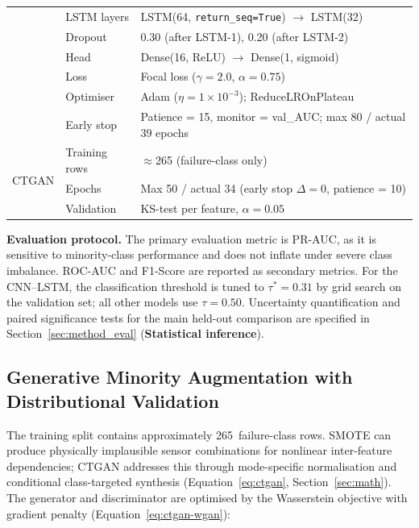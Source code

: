 \documentclass[sensors,article,submit,pdftex,moreauthors]{Definitions/mdpi}
\begin{document}
\begin{table}[H]
\begin{tabularx}{\textwidth}{llX}
  & LSTM layers     & LSTM(64, \texttt{return\_seq=True}) $\to$ LSTM(32) \\
  & Dropout         & 0.30 (after LSTM-1), 0.20 (after LSTM-2) \\
  & Head            & Dense(16, ReLU) $\to$ Dense(1, sigmoid) \\
  & Loss            & Focal loss ($\gamma = 2.0$, $\alpha = 0.75$) \\
  & Optimiser       & Adam ($\eta = 1\times10^{-3}$); ReduceLROnPlateau \\
  & Early stop      & Patience = 15, monitor = val\_AUC; max 80 / actual 39 epochs \\
\midrule
\multirow{3}{*}{CTGAN}
  & Training rows   & $\approx$265 (failure-class only) \\
  & Epochs          & Max 50 / actual 34 (early stop $\Delta = 0$, patience = 10) \\
  & Validation      & KS-test per feature, $\alpha = 0.05$ \\
\bottomrule
\end{tabularx}
\end{table}

\textbf{Evaluation protocol.}
The primary evaluation metric is PR-AUC, as it is sensitive to minority-class performance and does not inflate under severe class imbalance.
ROC-AUC and F1-Score are reported as secondary metrics.
For the CNN--LSTM, the classification threshold is tuned to $\tau^* = 0.31$ by grid search on the validation set; all other models use $\tau = 0.50$.
Uncertainty quantification and paired significance tests for the main
held-out comparison are specified in Section~\ref{sec:method_eval}
(\textbf{Statistical inference}).

\subsection{Generative Minority Augmentation with Distributional Validation}
\label{sec:method_ctgan}

The training split contains approximately 265~failure-class rows.
SMOTE \citep{ref-smote-fault2022} can produce physically implausible
sensor combinations for nonlinear inter-feature dependencies; CTGAN
\citep{ref-ctgan-original} addresses this through mode-specific
normalisation and conditional class-targeted synthesis
(Equation~\ref{eq:ctgan}, Section~\ref{sec:math}). The generator
and discriminator are optimised by the Wasserstein objective with
gradient penalty (Equation~\ref{eq:ctgan-wgan}):
\end{document}
